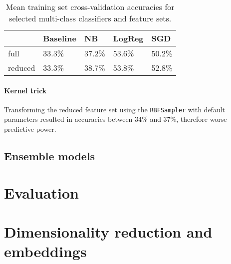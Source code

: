\documentclass[10pt, twocolumn]{article}
\begin{document}
\begin{table}[]
	\begin{tabularx}{\linewidth}{XXXXX}
		\hline
								 & \textbf{Baseline} & \textbf{NB} & \textbf{LogReg} & \textbf{SGD} \\ \hline
		full   & 33.3\%            & 37.2\%      & 53.6\%          & 50.2\%       \\
		reduced & 33.3\%            & 38.7\%      & 53.8\%          & 52.8\%       \\ \hline
		\end{tabularx}
\caption{Mean training set cross-validation accuracies for selected multi-class classifiers and feature sets.}\label{multiclass}
\end{table}

\paragraph{Kernel trick} Transforming the reduced feature set using the \texttt{RBFSampler} with default parameters resulted in accuracies between 34\% and 37\%, therefore worse predictive power.

\subsection{Ensemble models}




\section{Evaluation}

\section{Dimensionality reduction and embeddings}
\end{document}
